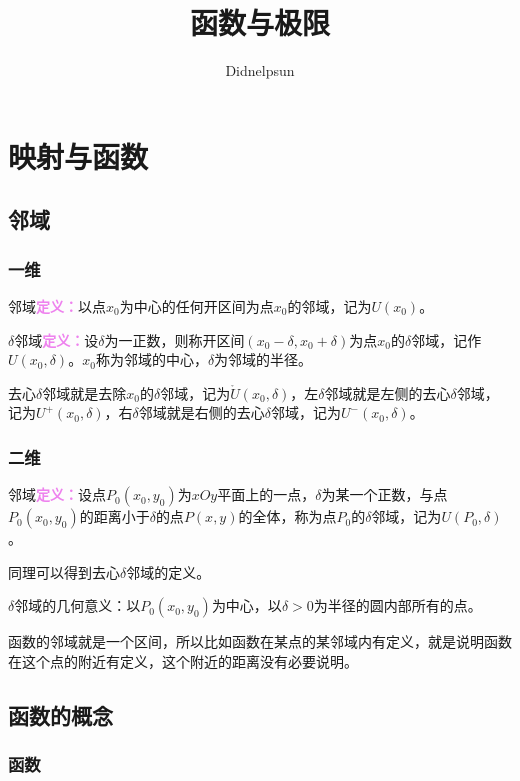\documentclass[UTF8, 12pt]{ctexart}
\author{Didnelpsun}
\title{函数与极限}
\date{}
\begin{document}
\renewcommand{\arraystretch}{1.5}
\maketitle
\pagestyle{empty}
\thispagestyle{empty}
\tableofcontents
\thispagestyle{empty}
\newpage
\pagestyle{plain}
\setcounter{page}{1}
\section{映射与函数}
\subsection{邻域}
\subsubsection{一维}

邻域\textcolor{violet}{\textbf{定义：}}以点$x_0$为中心的任何开区间为点$x_0$的邻域，记为$U(x_0)$。

$\delta$邻域\textcolor{violet}{\textbf{定义：}}设$\delta$为一正数，则称开区间$(x_0-\delta,x_0+\delta)$为点$x_0$的$\delta$邻域，记作$U(x_0,\delta)$。$x_0$称为邻域的中心，$\delta$为邻域的半径。

去心$\delta$邻域就是去除$x_0$的$\delta$邻域，记为$\mathring{U}(x_0,\delta)$，左$\delta$邻域就是左侧的去心$\delta$邻域，记为$U^+(x_0,\delta)$，右$\delta$邻域就是右侧的去心$\delta$邻域，记为$U^-(x_0,\delta)$。

\subsubsection{二维}

邻域\textcolor{violet}{\textbf{定义：}}设点$P_0(x_0,y_0)$为$xOy$平面上的一点，$\delta$为某一个正数，与点$P_0(x_0,y_0)$的距离小于$\delta$的点$P(x,y)$的全体，称为点$P_0$的$\delta$邻域，记为$U(P_0,\delta)$。

同理可以得到去心$\delta$邻域的定义。

$\delta$邻域的几何意义：以$P_0(x_0,y_0)$为中心，以$\delta>0$为半径的圆内部所有的点。

函数的邻域就是一个区间，所以比如函数在某点的某邻域内有定义，就是说明函数在这个点的附近有定义，这个附近的距离没有必要说明。

\subsection{函数的概念}
\subsubsection{函数}
\end{document}
